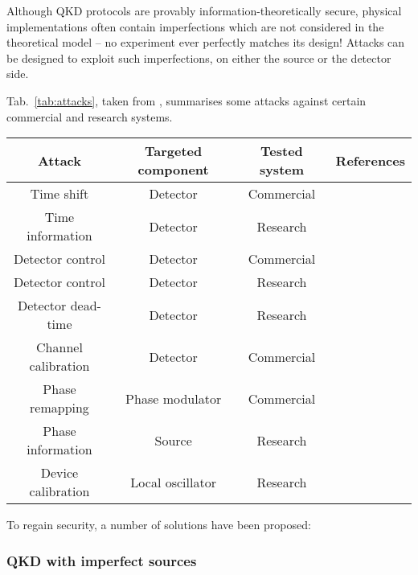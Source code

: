 Although QKD protocols are provably information-theoretically secure, physical implementations often contain imperfections which are not considered in the theoretical model -- no experiment ever perfectly matches its design! Attacks can be designed to exploit such imperfections, on either the source or the detector side.

Tab.~\ref{tab:attacks}, taken from \cite{bib:lo2014secure}, summarises some attacks against certain commercial and research systems.

\startnormtable
\begin{table*}[!htbp]
\begin{tabular}{|c|c|c|c|} 
 \hline
 Attack &  Targeted component & Tested system & References\\ 
  \hline
  \hline
Time shift
        & Detector & Commercial & \cite{bib:qi2005time, bib:PhysRevA.78.042333, bib:PhysRevA.74.022313}\\
Time information & Detector & Research & \cite{bib:lamas2007breaking} \\
Detector control & Detector  &   Commercial & \cite{bib:lydersen2010hacking, bib:yuan2010avoiding}\\
Detector control  & Detector  & Research & \cite{bib:gerhardt2011full} \\
Detector dead-time      & Detector  & Research   & \cite{bib:weier2011quantum}      \\
Channel calibration    & Detector  &  Commercial  & \cite{bib:jain2011device}      \\
Phase remapping  &  Phase modulator & Commercial & \cite{bib:xu2010experimental} \\
Phase information & Source & Research & \cite{bib:tang2013source}          \\
Device calibration  & Local oscillator & Research & \cite{bib:jouguet2013preventing} \\
                \hline
\end{tabular}
\captionspacetab \caption{\label{tab:attacks} Summary of various attacks against some commercial and 
research QKD systems.}
\end{table*}
\startalgtable

To regain security, a number of solutions have been proposed:

\subsubsection{QKD with imperfect sources}

